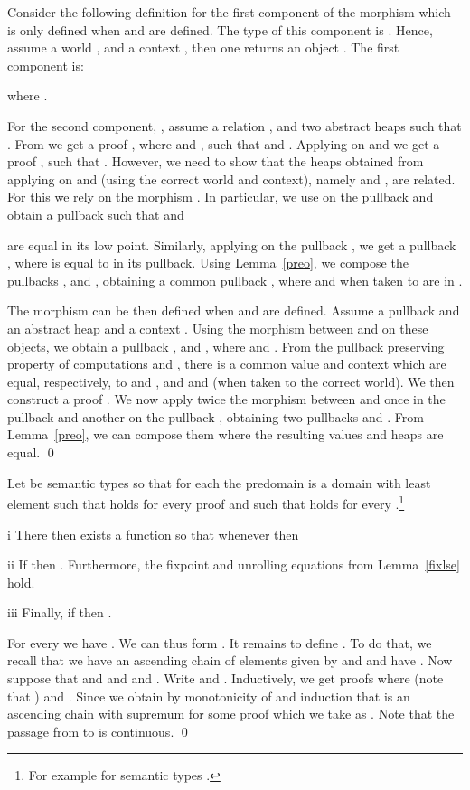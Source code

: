 \documentclass[orivec]{llncs}
\renewenvironment{proof}{\vspace{-1mm} \noindent {\bf Proof}\quad}{\qed}
\begin{document}
\begin{proof}
Consider the following definition for the first component of the morphism
 which is only defined when  and
 are defined. The type of this component is . Hence, assume a world , and a context , then one returns an object . The first component  is:

where .

For the second component, , assume a relation , and two abstract heaps 
such that . From  we get a 
proof , where
 and , such that  and . Applying  on  and
 we get a proof ,
such that . However,
we need to show that the heaps obtained from applying  on 
and  (using the correct world and context), namely 
and , are related. For this we rely on
the morphism . In particular,
we use  on the pullback  and
obtain a pullback  such that  and

are equal in its low point. Similarly, applying  on the
pullback , we get a pullback 
, where  is equal to
 in its pullback. Using Lemma~\ref{preo}, we compose the
pullbacks ,  and , obtaining a common pullback , where 
 and  when taken to  are in . 

The morphism  can be then defined when 
and  are defined.
Assume a pullback  and an abstract heap  and a context . Using the
morphism between  and  on these objects, we obtain a
pullback ,  and , where  and . 
From the pullback preserving property of computations and ,
there is a common value  and context
 which are equal, respectively, to
 and , and  and  (when taken to the
correct world). We then construct a
proof . We now apply twice the
morphism between  and  once in the pullback  and
another on the
pullback , obtaining two pullbacks
 and . From
Lemma~\ref{preo}, we can compose them where the resulting values and
heaps are equal.
\end{proof}


\begin{lemma}[fix]\label{fixlse}
  Let  be semantic types so that for each  the predomain
   is a domain with least element  such that
   holds for every proof  and such that  holds for every
  .\footnote{For example 
for semantic types .}
\begin{compactenum}
\item[i] There then exists a function
   so that whenever  then
  
\item[ii] If  then . Furthermore, the fixpoint and unrolling equations
  from Lemma~\ref{fixlse} hold. 
\item[iii] Finally, if  then
.    
\end{compactenum}
\end{lemma}
\begin{proof}
For every  we have . We can thus form .  It remains to define . To do that, we
recall that we 
have an ascending chain of elements 
 given by 
 and 
 and have
. 
Now suppose that  and  and
 and . Write
 and .
Inductively, we get proofs  where  (note that
) and . Since
 we obtain by
monotonicity of  and induction that  is an ascending
chain with supremum  for some proof 
which we take as . Note that the passage from  to
 is continuous. 
\end{proof}
\end{document}
